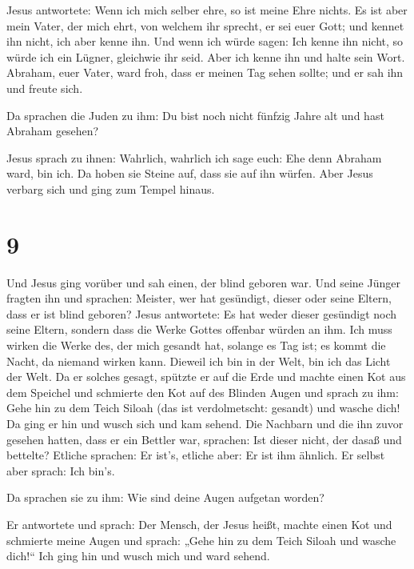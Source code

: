  Jesus antwortete: Wenn ich mich selber ehre, so ist
meine Ehre nichts. Es ist aber mein Vater, der mich ehrt, von welchem
ihr sprecht, er sei euer Gott;  und kennet ihn nicht, ich
aber kenne ihn. Und wenn ich würde sagen: Ich kenne ihn nicht, so würde
ich ein Lügner, gleichwie ihr seid. Aber ich kenne ihn und halte sein
Wort.  Abraham, euer Vater, ward froh, dass er meinen Tag
sehen sollte; und er sah ihn und freute sich.

 Da sprachen die Juden zu ihm: Du bist noch nicht fünfzig
Jahre alt und hast Abraham gesehen?

 Jesus sprach zu ihnen: Wahrlich, wahrlich ich sage euch:
Ehe denn Abraham ward, bin ich.  Da hoben sie Steine auf,
dass sie auf ihn würfen. Aber Jesus verbarg sich und ging zum Tempel
hinaus.

\hypertarget{section-8}{%
\section{9}\label{section-8}}

 Und Jesus ging vorüber und sah einen, der blind geboren
war.  Und seine Jünger fragten ihn und sprachen: Meister,
wer hat gesündigt, dieser oder seine Eltern, dass er ist blind geboren?
 Jesus antwortete: Es hat weder dieser gesündigt noch
seine Eltern, sondern dass die Werke Gottes offenbar würden an ihm.
 Ich muss wirken die Werke des, der mich gesandt hat,
solange es Tag ist; es kommt die Nacht, da niemand wirken kann.
 Dieweil ich bin in der Welt, bin ich das Licht der Welt.
 Da er solches gesagt, spützte er auf die Erde und machte
einen Kot aus dem Speichel und schmierte den Kot auf des Blinden Augen
 und sprach zu ihm: Gehe hin zu dem Teich Siloah (das ist
verdolmetscht: gesandt) und wasche dich! Da ging er hin und wusch sich
und kam sehend.  Die Nachbarn und die ihn zuvor gesehen
hatten, dass er ein Bettler war, sprachen: Ist dieser nicht, der dasaß
und bettelte?  Etliche sprachen: Er ist's, etliche aber:
Er ist ihm ähnlich. Er selbst aber sprach: Ich bin's.

 Da sprachen sie zu ihm: Wie sind deine Augen aufgetan
worden?

 Er antwortete und sprach: Der Mensch, der Jesus heißt,
machte einen Kot und schmierte meine Augen und sprach: „Gehe hin zu dem
Teich Siloah und wasche dich!{}`` Ich ging hin und wusch mich und ward
sehend.

